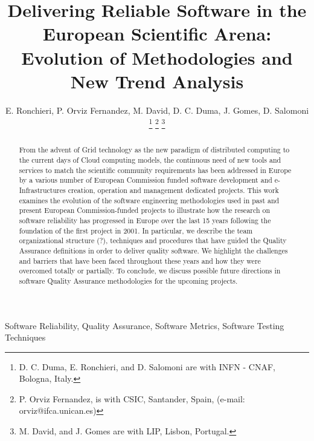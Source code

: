 \documentclass[journal]{IEEEtran}
\begin{document}
\title{Delivering Reliable Software in the European Scientific Arena: Evolution of Methodologies and New Trend Analysis}

\author{E. Ronchieri,
        P. Orviz Fernandez,
        M. David,
		D. C. Duma,
        J. Gomes,
        D. Salomoni
\thanks{D. C. Duma, E. Ronchieri, and D. Salomoni are with INFN - CNAF, Bologna, Italy.}
\thanks{P. Orviz Fernandez, is with CSIC, Santander, Spain, (e-mail: orviz@ifca.unican.es)}
\thanks{M. David, and J. Gomes are with LIP, Lisbon, Portugal.}%
}


\maketitle

\begin{abstract}
From the advent of Grid technology as the new paradigm of distributed
computing to the current days of Cloud computing models, the continuous need
of new tools and services to match the scientific community requirements has been
addressed in Europe by a various number of European Commission funded software development
and e-Infrastructures creation, operation and management dedicated projects.
This work examines the evolution of the software engineering methodologies used in past and present
European Commission-funded projects to illustrate how the research on software
reliability has progressed in Europe over the last 15 years following the
foundation of the first project in 2001. In particular, we describe the team
organizational structure (?), techniques and procedures that have guided the Quality
Assurance definitions in order to deliver quality software. We highlight the challenges
and barriers that have been faced throughout these years and how they were overcomed totally or
partially. To conclude, we discuss possible future directions in software
Quality Assurance methodologies for the upcoming projects.
\end{abstract}

\begin{IEEEkeywords}
Software Reliability, Quality Assurance, Software Metrics, Software Testing
Techniques
\end{IEEEkeywords}

\IEEEpeerreviewmaketitle
\end{document}
